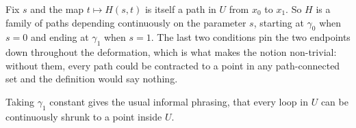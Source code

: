 \begin{remark}
\label{rem:homotopy_as_deformation}
Fix $s$ and the map $t \mapsto H(s,t)$ is itself a path in $U$ from $x_0$ to $x_1$. So $H$ is a
family of paths depending continuously on the parameter $s$, starting at $\gamma_0$ when $s=0$ and
ending at $\gamma_1$ when $s=1$. The last two conditions pin the two endpoints down throughout the
deformation, which is what makes the notion non-trivial: without them, every path could be
contracted to a point in any path-connected set and the definition would say nothing.

Taking $\gamma_1$ constant gives the usual informal phrasing, that every loop in $U$ can be
continuously shrunk to a point inside $U$.
\end{remark}


